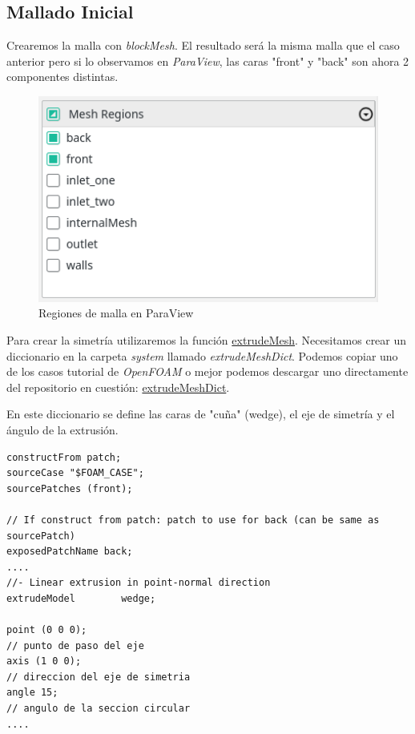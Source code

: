 \documentclass{article}
\begin{document}
\subsection{Mallado Inicial}
Crearemos la malla con \textit{blockMesh}. El resultado será la misma malla que el caso anterior pero si lo observamos en \textit{ParaView}, las caras "front" y "back" son ahora 2 componentes distintas.

\begin{figure}[h!]
	\centering
	\includegraphics[width=1\textwidth]{Figuras/02_mesh_regions.png}
	\caption{Regiones de malla en ParaView}
	\label{fig:preliminar}
\end{figure}

Para crear la simetría utilizaremos la función \href{https://www.openfoam.com/documentation/guides/latest/man/extrudeMesh.html}{extrudeMesh}. Necesitamos crear un diccionario en la carpeta \textit{system} llamado \textit{extrudeMeshDict}. Podemos copiar uno de los casos tutorial de \textit{OpenFOAM} o mejor podemos descargar uno directamente del repositorio en cuestión: \href{https://github.com/guillerolle/casos_cfd/blob/master/02/system/extrudeMeshDict}{extrudeMeshDict}.\par
En este diccionario se define las caras de "cuña" (wedge), el eje de simetría y el ángulo de la extrusión.

\begin{lstlisting}
constructFrom patch;
sourceCase "$FOAM_CASE";
sourcePatches (front);

// If construct from patch: patch to use for back (can be same as sourcePatch)
exposedPatchName back;
....
//- Linear extrusion in point-normal direction
extrudeModel        wedge;

point (0 0 0);
// punto de paso del eje
axis (1 0 0);
// direccion del eje de simetria
angle 15;
// angulo de la seccion circular
....
\end{lstlisting}
\end{document}
